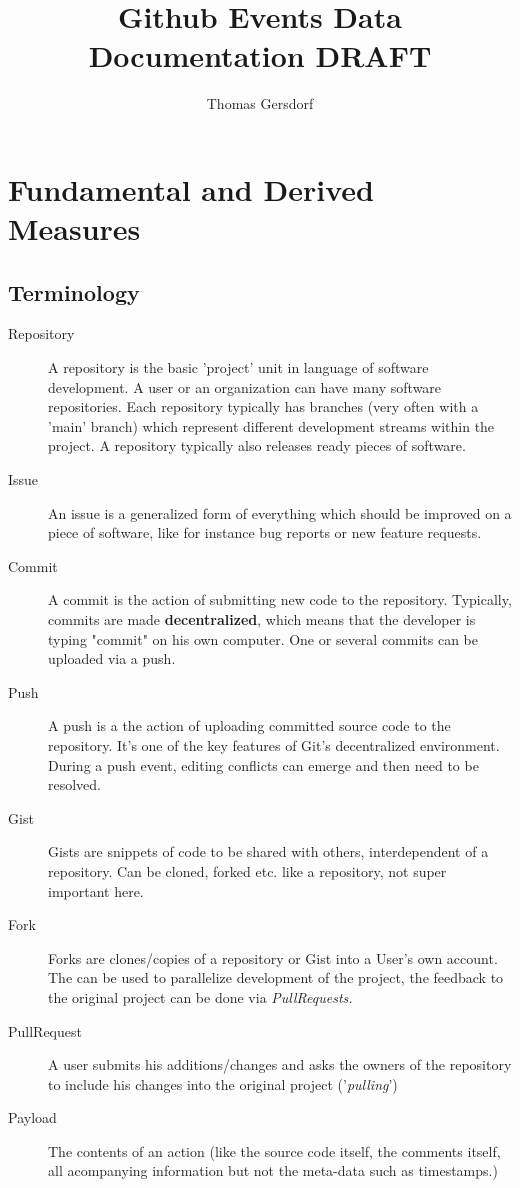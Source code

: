 \documentclass[a4paper,10pt]{article}
\title{Github Events Data Documentation DRAFT}
\author{Thomas Gersdorf}
\begin{document}
\maketitle


\tableofcontents


\section{Fundamental and Derived Measures}
\subsection{Terminology}
\begin{description}
\item [Repository] A repository is the basic 'project' unit in language of software development. A user or an organization can have many software repositories. Each repository typically has branches (very often with a 'main' branch) which represent different development streams within the project. A repository typically also releases ready pieces of software.
\item[Issue] An issue is a generalized form of everything which should be improved on a piece of software, like for instance bug reports or new feature requests.
\item [Commit] A commit is the action of submitting new code to the repository. Typically, commits are made \textbf{decentralized}, which means that the developer is typing "commit" on his own computer. One or several commits can be uploaded via a push.
\item [Push ] A push is a the action of uploading committed source code to the repository. It's one of the key features of Git's decentralized environment. During a push event, editing conflicts can emerge and then need to be resolved.
 \item[Gist] Gists are snippets of code to be shared with others, interdependent of a repository. Can be cloned, forked etc. like a repository, not super important here.
\item [Fork] Forks are clones/copies of a repository or Gist into a User's own account. The can be used to parallelize development of the project, the feedback to the original project can be done via \textit{PullRequests.}
\item [PullRequest] A user submits his additions/changes and asks the owners of the repository to include his changes into the original project ('\textit{pulling}')
\item [Payload] The contents of an action (like the source code itself, the comments itself, all acompanying information but not the meta-data such as timestamps.)
\end{description}
\end{document}
